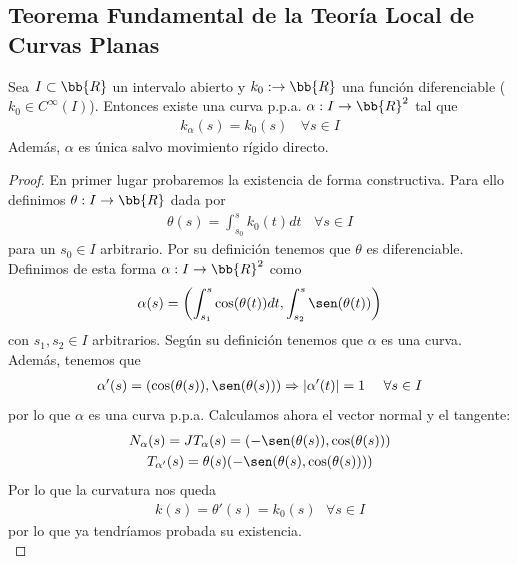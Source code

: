 \subsection{Teorema Fundamental de la Teoría Local de Curvas Planas}
\begin{teo}
    Sea $I\subset \bb{R}$ un intervalo abierto y $k_0:\to \bb{R}$ una función diferenciable ($k_0\in C^\infty(I)$). Entonces existe una curva p.p.a. $\alpha:I \to \bb{R}^2$ tal que 
    \begin{gather*}
        k_\alpha(s) = k_0(s)\ \ \ \ \forall s\in I
    \end{gather*}
    Además, $\alpha$ es única salvo movimiento rígido directo.
    \begin{proof}
        En primer lugar probaremos la existencia de forma constructiva. Para ello definimos $\theta : I \to \bb{R}$ dada por 
        \begin{gather*}
            \theta(s) = \int_{s_0}^{s} k_0(t) dt \ \ \ \ \forall s \in I
        \end{gather*}
        para un $s_0\in I$ arbitrario. Por su definición tenemos que $\theta$ es diferenciable. Definimos de esta forma $\alpha : I \to \bb{R}^2$ como 
        \begin{gather*}
            \alpha(s) = \left( \int_{s_1}^{s} \cos(\theta(t)) dt, \int_{s_2}^s \sen(\theta(t)) \right)
        \end{gather*}
        con $s_1,s_2\in I$ arbitrarios. Según su definición tenemos que $\alpha$ es una curva. Además, tenemos que 
        \begin{gather*}
            \alpha'(s) = (\cos(\theta(s)), \sen(\theta(s))) \Rightarrow
            |\alpha'(t)| = 1 \ \ \ \ \forall s \in I
        \end{gather*}
        por lo que $\alpha$ es una curva p.p.a. Calculamos ahora el vector normal y el tangente:
        \begin{gather*}
            N_\alpha(s) = JT_\alpha(s) = (-\sen(\theta(s)), \cos(\theta(s)))\\
            T_{\alpha'}(s) = \theta(s)(-\sen(\theta(s), \cos(\theta(s))))
        \end{gather*}
        Por lo que la curvatura nos queda
        \begin{gather*}
            k(s) = \theta'(s) = k_0(s)\ \ \ \forall s \in I
        \end{gather*}
        por lo que ya tendríamos probada su existencia.\\


\end{proof}
\end{teo}
